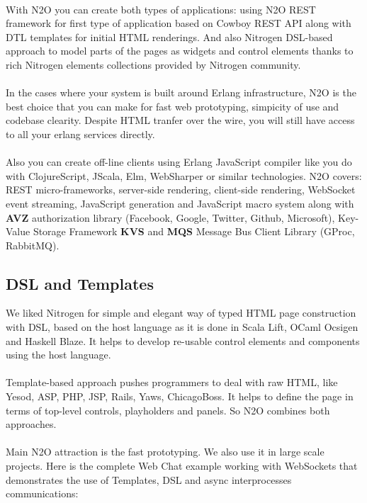 \paragraph{}
With N2O you can create both types of applications: using N2O REST framework
for first type of application based on Cowboy REST API along with DTL
templates for initial HTML renderings. And also Nitrogen DSL-based approach
to model parts of the pages as widgets and control elements thanks to rich
Nitrogen elements collections provided by Nitrogen community. 
\paragraph{}
In the cases where your system is built around Erlang infrastructure, N2O
is the best choice that you can make for fast web prototyping, simpicity
of use and codebase clearity. Despite HTML tranfer over the wire,
you will still have access to all your erlang services directly.
\paragraph{}
Also you can create off-line clients using Erlang JavaScript compiler
like you do with ClojureScript, JScala, Elm, WebSharper or similar
technologies. N2O covers: REST micro-frameworks, server-side rendering,
client-side rendering, WebSocket event streaming, JavaScript generation
and JavaScript macro system along with {\bf AVZ} authorization
library (Facebook, Google, Twitter, Github, Microsoft), Key-Value Storage
Framework {\bf KVS} and {\bf MQS} Message Bus Client Library (GProc, RabbitMQ).

\subsection*{DSL and Templates}
We liked Nitrogen for simple and elegant way of typed HTML page
construction with DSL, based on the host language as it is done in Scala Lift,
OCaml Ocsigen and Haskell Blaze. It helps to develop re-usable control
elements and components using the host language.
\paragraph{}
Template-based approach pushes programmers to deal with raw HTML,
like Yesod, ASP, PHP, JSP, Rails, Yaws, ChicagoBoss. It helps to
define the page in terms of top-level controls, playholders
and panels. So N2O combines both approaches.
\paragraph{}
Main N2O attraction is the fast prototyping. We also use it in large
scale projects. Here is the complete Web Chat example working with
WebSockets that demonstrates the use of Templates, DSL and async
interprocesses communications:

